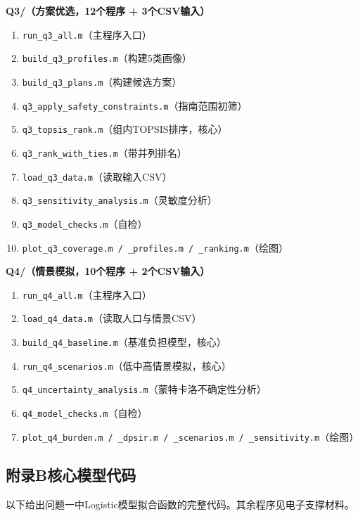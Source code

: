 \vspace{0.2em}
\noindent\textbf{Q3/（方案优选，12个程序 + 3个CSV输入）}
\begin{enumerate}[leftmargin=2em,itemsep=0pt]
  \item \texttt{run\_q3\_all.m}（主程序入口）
  \item \texttt{build\_q3\_profiles.m}（构建5类画像）
  \item \texttt{build\_q3\_plans.m}（构建候选方案）
  \item \texttt{q3\_apply\_safety\_constraints.m}（指南范围初筛）
  \item \texttt{q3\_topsis\_rank.m}（组内TOPSIS排序，核心）
  \item \texttt{q3\_rank\_with\_ties.m}（带并列排名）
  \item \texttt{load\_q3\_data.m}（读取输入CSV）
  \item \texttt{q3\_sensitivity\_analysis.m}（灵敏度分析）
  \item \texttt{q3\_model\_checks.m}（自检）
  \item \texttt{plot\_q3\_coverage.m / \_profiles.m / \_ranking.m}（绘图）
\end{enumerate}

\vspace{0.2em}
\noindent\textbf{Q4/（情景模拟，10个程序 + 2个CSV输入）}
\begin{enumerate}[leftmargin=2em,itemsep=0pt]
  \item \texttt{run\_q4\_all.m}（主程序入口）
  \item \texttt{load\_q4\_data.m}（读取人口与情景CSV）
  \item \texttt{build\_q4\_baseline.m}（基准负担模型，核心）
  \item \texttt{run\_q4\_scenarios.m}（低中高情景模拟，核心）
  \item \texttt{q4\_uncertainty\_analysis.m}（蒙特卡洛不确定性分析）
  \item \texttt{q4\_model\_checks.m}（自检）
  \item \texttt{plot\_q4\_burden.m / \_dpsir.m / \_scenarios.m / \_sensitivity.m}（绘图）
\end{enumerate}

\subsection*{附录B\quad 核心模型代码}

以下给出问题一中Logistic模型拟合函数的完整代码。其余程序见电子支撑材料。

